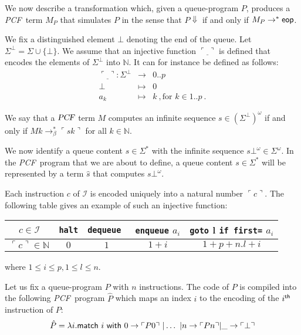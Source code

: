 \documentclass{article}
\newcommand\nat{\mathbb{N}}
\newcommand\eop{{\sf eop}}
\newcommand{\betared}{\rightarrow_\beta}
\newcommand{\encode}[1]{\ulcorner #1 \urcorner}
\newcommand\pcf{\textsl{PCF}}
\begin{document}
We now describe a transformation which, given a queue-program $P$, produces a \pcf\ term $M_P$ that simulates $P$ in the sense that $P \Downarrow$ if and only if $M_P \rightarrow^* \eop$.

We fix a distinguished element $\bot$ denoting the end of the queue. Let $\Sigma^\bot = \Sigma \cup \{ \bot \}$. We assume that an injective function $\encode{\underline{\ }}$ is defined that encodes  the
elements of $\Sigma^\bot$ into $\nat$. It can for instance be defined as follows:
\begin{eqnarray*}
\encode{\underline{\ }} : \Sigma^\bot &\longrightarrow& 0..p \\
 \bot &\mapsto& 0 \\
 a_k &\mapsto& k \ , \mbox{for } k \in 1..p \ .
\end{eqnarray*}

We say that a $\pcf$ term $M$ computes an infinite sequence $s \in {(\Sigma^\bot)}^\omega$ if and only if 
$M k \betared^* \encode{s k}$ for all $k\in \nat$.

We now identify a queue content $s \in \Sigma^*$ with the infinite sequence $s \bot^\omega \in \Sigma^\omega$. In the \pcf\ program that we are about to define, a queue content $s \in \Sigma^*$ will be represented by a term $\hat{s}$ that computes $s \bot^\omega$.

Each instruction $c$ of $\mathcal{I}$ is encoded uniquely into a natural number $\encode{ c }$. The following table gives an example of such an injective function:
\begin{center}
\begin{tabular}{c|c|c|c|c}
$c \in \mathcal{I}$ & {\tt halt} & {\tt dequeue } & {\tt enqueue} $a_i$ &  {\tt goto} l {\tt if first=} $a_i$ \\ \hline
$\encode{ c } \in \nat$ & $0$ & $1$ & $1+i$ & $1+p + n.l +i$ \\
\end{tabular} 
\end{center}
where $1 \leq i \leq p, 1 \leq l \leq n$.

Let us fix a queue-program $P$ with $n$ instructions. 
The code of $P$ is compiled into the following \pcf\ program $\hat{P}$
which maps an index $i$ to the encoding of the $i^{\sf th}$ instruction of $P$:
\begin{equation}
\hat{P} = \lambda i .  {\sf match\ } i {\sf \ with\ } 
   0 \rightarrow \encode{ P 0 } 
  \ | \ldots \ | n \rightarrow \encode{ P n }  | \_ \rightarrow \encode{\bot}
\end{equation} 
\end{document}
